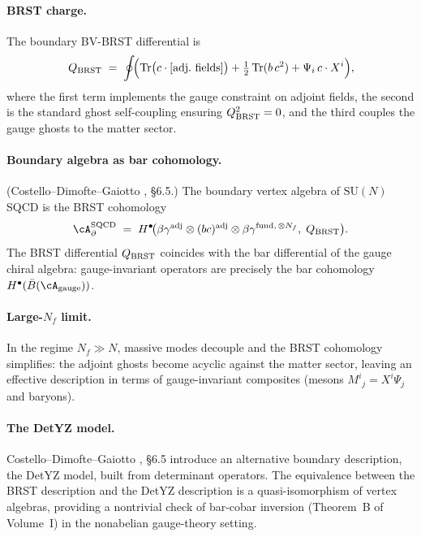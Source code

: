 \paragraph{BRST charge.}
The boundary BV-BRST differential is
\begin{equation}%
 \QBRST \;=\; \oint\!\Bigl(
 \operatorname{Tr}\bigl(c \cdot [\text{adj.\ fields}]\bigr)
 + \tfrac{1}{2}\operatorname{Tr}(b\, c^2)
 + \Psi_i\, c \cdot X^i
 \Bigr),
\end{equation}
where the first term implements the gauge constraint on adjoint fields,
the second is the standard ghost self-coupling ensuring $Q_{\mathrm{BRST}}^2 = 0$,
and the third couples the gauge ghosts to the matter sector.

\paragraph{Boundary algebra as bar cohomology.}
\begin{proposition}
\textup{(Costello--Dimofte--Gaiotto \cite{CDG2023}, \S6.5.)}
The boundary vertex algebra of $\mathrm{SU}(N)$ SQCD is the BRST
cohomology
\[
 \cA_\partial^{\mathrm{SQCD}}
 \;=\;
 H^\bullet\!\bigl(
 \beta\gamma^{\mathrm{adj}} \otimes (bc)^{\mathrm{adj}}
 \otimes \beta\gamma^{\mathrm{fund},\, \otimes N_f},\;
 \QBRST
 \bigr).
\]
The BRST differential $Q_{\mathrm{BRST}}$ coincides with the bar differential of
the gauge chiral algebra: gauge-invariant operators are precisely the
bar cohomology $H^\bullet(\bar{B}(\cA_{\mathrm{gauge}}))$.
\end{proposition}

\paragraph{Large-$N_f$ limit.}
In the regime $N_f \gg N$, massive modes decouple and the BRST
cohomology simplifies: the adjoint ghosts become acyclic against the
matter sector, leaving an effective description in terms of
gauge-invariant composites (mesons $M^i{}_j = X^i \Psi_j$ and baryons).

\paragraph{The DetYZ model.}
Costello--Dimofte--Gaiotto \cite{CDG2023}, \S6.5 introduce an
alternative boundary description, the DetYZ model, built from
determinant operators. The equivalence between the BRST description
and the DetYZ description is a quasi-isomorphism of vertex algebras,
providing a nontrivial check of bar-cobar inversion (Theorem~B of
Volume~I) in the nonabelian gauge-theory setting.

